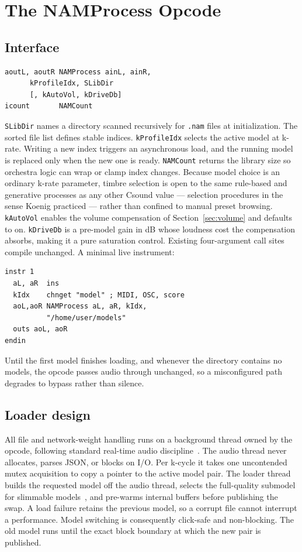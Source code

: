 \documentclass[sigconf,anonymous,review]{nimeart}
\begin{document}
\section{The NAMProcess Opcode}
\label{sec:opcode}

\subsection{Interface}
\label{sec:interface}

\begin{verbatim}
aoutL, aoutR NAMProcess ainL, ainR,
      kProfileIdx, SLibDir
      [, kAutoVol, kDriveDb]
icount       NAMCount
\end{verbatim}

\texttt{SLibDir} names a directory scanned recursively for \texttt{.nam}
files at initialization. The sorted file list defines stable indices.
\texttt{kProfileIdx} selects the active model at k-rate. Writing a new
index triggers an asynchronous load, and the running model is replaced
only when the new one is ready. \texttt{NAMCount} returns the library size
so orchestra logic can wrap or clamp index changes. Because model choice
is an ordinary k-rate parameter, timbre selection is open to the same
rule-based and generative processes as any other Csound value ---
selection procedures in the sense Koenig practiced --- rather than
confined to manual preset browsing. \texttt{kAutoVol}
enables the volume compensation of Section~\ref{sec:volume} and defaults
to on. \texttt{kDriveDb} is a pre-model gain in dB whose loudness cost the
compensation absorbs, making it a pure saturation control. Existing
four-argument call sites compile unchanged. A minimal live instrument:

\begin{verbatim}
instr 1
  aL, aR  ins
  kIdx    chnget "model" ; MIDI, OSC, score
  aoL,aoR NAMProcess aL, aR, kIdx,
          "/home/user/models"
  outs aoL, aoR
endin
\end{verbatim}

Until the first model finishes loading, and whenever the directory
contains no models, the opcode passes audio through unchanged, so a
misconfigured path degrades to bypass rather than silence.

\subsection{Loader design}
\label{sec:loader}

All file and network-weight handling runs on a background thread owned by
the opcode, following standard real-time audio
discipline~\cite{bencina2011realtime}. The audio thread never allocates,
parses JSON, or blocks on I/O. Per k-cycle it takes one uncontended mutex
acquisition to copy a pointer to the active model pair. The loader thread
builds the requested model off the audio thread, selects the full-quality
submodel for slimmable models~\cite{atkinson2025slimmable}, and pre-warms
internal buffers before publishing the swap. A load failure retains the
previous model, so a corrupt file cannot interrupt a performance. Model
switching is consequently click-safe and non-blocking. The old model runs
until the exact block boundary at which the new pair is published.
\end{document}
